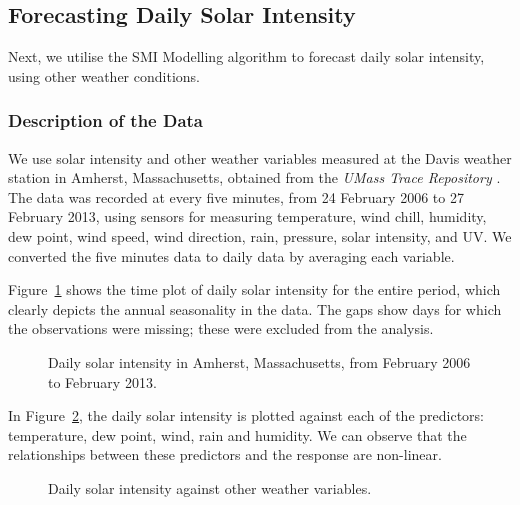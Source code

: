 \documentclass[
  11pt,
  a4paper,
]{article}
\begin{document}
\pagebreak

\subsection{Forecasting Daily Solar Intensity}\label{sec-solar}

Next, we utilise the SMI Modelling algorithm to forecast daily solar
intensity, using other weather conditions.

\subsubsection{Description of the Data}\label{description-of-the-data-1}

We use solar intensity and other weather variables measured at the Davis
weather station in Amherst, Massachusetts, obtained from the \emph{UMass
Trace Repository} \autocite{Umass2023}. The data was recorded at every
five minutes, from 24 February 2006 to 27 February 2013, using sensors
for measuring temperature, wind chill, humidity, dew point, wind speed,
wind direction, rain, pressure, solar intensity, and UV. We converted
the five minutes data to daily data by averaging each variable.

Figure~\ref{fig-solar} shows the time plot of daily solar intensity for
the entire period, which clearly depicts the annual seasonality in the
data. The gaps show days for which the observations were missing; these
were excluded from the analysis.

\begin{figure}


\caption{\label{fig-solar}Daily solar intensity in Amherst,
Massachusetts, from February 2006 to February 2013.}

\end{figure}%

In Figure~\ref{fig-preds}, the daily solar intensity is plotted against
each of the predictors: temperature, dew point, wind, rain and humidity.
We can observe that the relationships between these predictors and the
response are non-linear.

\begin{figure}


\caption{\label{fig-preds}Daily solar intensity against other weather
variables.}

\end{figure}%
\end{document}
